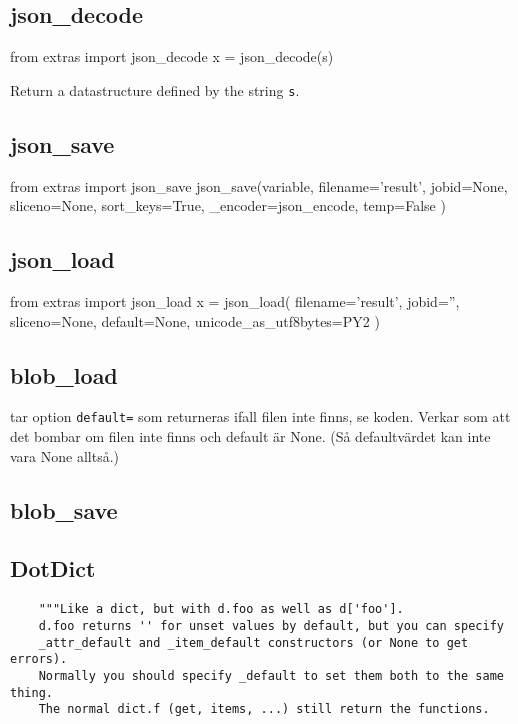 \subsection{json\_decode}
\begin{python}
from extras import json_decode
x = json_decode(s)
\end{python}
Return a datastructure defined by the string \texttt{s}.




\subsection{json\_save}
\begin{python}
from extras import json_save
json_save(variable,
    filename='result',
    jobid=None,
    sliceno=None,
    sort_keys=True,
    _encoder=json_encode,
    temp=False
)
\end{python}




\subsection{json\_load}
\begin{python}
from extras import json_load
x = json_load(
    filename='result',
    jobid='',
    sliceno=None,
    default=None,
    unicode_as_utf8bytes=PY2
)
\end{python}


\subsection{blob\_load}
tar option \texttt{default=} som returneras ifall filen inte finns,
se koden.  Verkar som att det bombar om filen inte finns och default är None.
(Så defaultvärdet kan inte vara None alltså.)


\subsection{blob\_save}





\subsection{DotDict}
\begin{verbatim}
    """Like a dict, but with d.foo as well as d['foo'].
    d.foo returns '' for unset values by default, but you can specify
    _attr_default and _item_default constructors (or None to get errors).
    Normally you should specify _default to set them both to the same thing.
    The normal dict.f (get, items, ...) still return the functions.
\end{verbatim}




